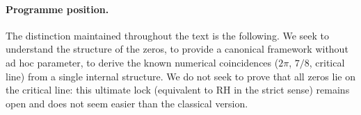 \paragraph{Programme position.}
The distinction maintained throughout the text is the following. We seek
to understand the structure of the zeros, to provide a canonical framework
without ad hoc parameter, to derive the known numerical coincidences
($2\pi$, $7/8$, critical line) from a single internal structure. We do
not seek to prove that all zeros lie on the critical line: this ultimate
lock (equivalent to RH in the strict sense) remains open and does not
seem easier than the classical version.

